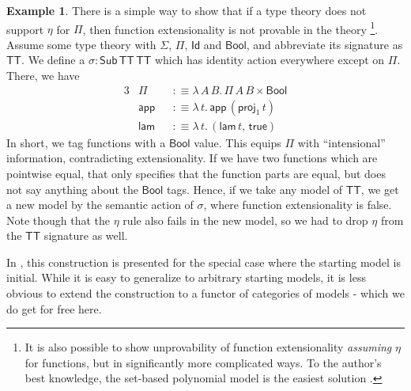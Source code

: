 \documentclass[12pt,a4paper,twoside,openany]{book}
\theoremstyle{remark}
\theoremstyle{definition}
\newtheorem{myexample}{Example}
\theoremstyle{theorem}
\newcommand{\ms}[1]{\mathsf{#1}}
\newcommand{\Sub}{\mathsf{Sub}}
\newcommand{\Id}{\mathsf{Id}}
\newcommand{\proj}{\mathsf{proj}}
\newcommand{\app}{\ms{app}}
\newcommand{\Bool}{\ms{Bool}}
\newcommand{\lam}{\ms{lam}}
\newcommand{\true}{\ms{true}}
\newcommand{\defn}{:\equiv}
\begin{document}
\begin{myexample}
There is a simple way to show that if a type theory does not support $\eta$ for
$\Pi$, then function extensionality is not provable in the theory
\cite{next700}\footnote{It is also possible to show unprovability of function
extensionality \emph{assuming} $\eta$ for functions, but in significantly more
complicated ways. To the author's best knowledge, the set-based polynomial model
is the easiest solution \cite{von2015polynomials}.}.  Assume some type theory with $\Sigma$,
$\Pi$, $\Id$ and $\Bool$, and abbreviate its signature as $\ms{TT}$. We define a
$\sigma : \Sub\,\ms{TT}\,\ms{TT}$ which has identity action everywhere except on
$\Pi$. There, we have
\begin{alignat*}{3}
  &\Pi    &&\defn \lambda\,A\,B.\,\Pi\,A\,B \times \Bool \\
  &\app   &&\defn \lambda\,t.\,\app\,(\proj_1\,t)\\
  &\lam   &&\defn \lambda\,t.\,(\lam\,t,\,\true)
\end{alignat*}
In short, we tag functions with a $\Bool$ value. This equips $\Pi$ with
``intensional'' information, contradicting extensionality. If we have two
functions which are pointwise equal, that only specifies that the function parts
are equal, but does not say anything about the $\Bool$ tags. Hence, if we take
any model of $\ms{TT}$, we get a new model by the semantic action of $\sigma$,
where function extensionality is false. Note though that the $\eta$ rule also
fails in the new model, so we had to drop $\eta$ from the $\ms{TT}$ signature
as well.

In \cite{next700}, this construction is presented for the special case where the
starting model is initial. While it is easy to generalize to arbitrary starting
models, it is less obvious to extend the construction to a functor of categories
of models - which we do get for free here.
\end{myexample}
\end{document}

